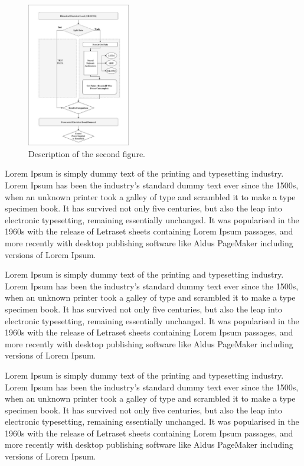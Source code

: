 \documentclass[conference]{IEEEtran}
\begin{document}
\begin{figure}[htbp]
  \centering
  \includegraphics[width=0.4\textwidth]{NN_Model.eps}
  \caption{Description of the second figure.}
  \label{fig:figure5}
\end{figure}

Lorem Ipsum is simply dummy text of the printing and typesetting industry. Lorem Ipsum has been the industry's standard dummy text ever since the 1500s, when an unknown printer took a galley of type and scrambled it to make a type specimen book. It has survived not only five centuries, but also the leap into electronic typesetting, remaining essentially unchanged. It was popularised in the 1960s with the release of Letraset sheets containing Lorem Ipsum passages, and more recently with desktop publishing software like Aldus PageMaker including versions of Lorem Ipsum.

Lorem Ipsum is simply dummy text of the printing and typesetting industry. Lorem Ipsum has been the industry's standard dummy text ever since the 1500s, when an unknown printer took a galley of type and scrambled it to make a type specimen book. It has survived not only five centuries, but also the leap into electronic typesetting, remaining essentially unchanged. It was popularised in the 1960s with the release of Letraset sheets containing Lorem Ipsum passages, and more recently with desktop publishing software like Aldus PageMaker including versions of Lorem Ipsum.

Lorem Ipsum is simply dummy text of the printing and typesetting industry. Lorem Ipsum has been the industry's standard dummy text ever since the 1500s, when an unknown printer took a galley of type and scrambled it to make a type specimen book. It has survived not only five centuries, but also the leap into electronic typesetting, remaining essentially unchanged. It was popularised in the 1960s with the release of Letraset sheets containing Lorem Ipsum passages, and more recently with desktop publishing software like Aldus PageMaker including versions of Lorem Ipsum.
\end{document}
